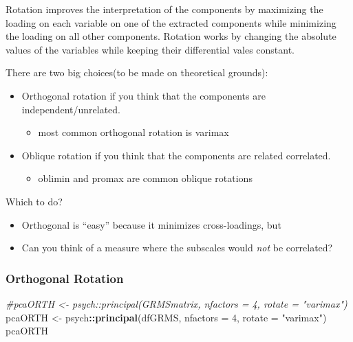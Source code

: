 \documentclass[
  english,
]{book}
\newenvironment{Shaded}{\begin{snugshade}}{\end{snugshade}}
\newcommand{\CommentTok}[1]{\textcolor[rgb]{0.56,0.35,0.01}{\textit{#1}}}
\newcommand{\DataTypeTok}[1]{\textcolor[rgb]{0.13,0.29,0.53}{#1}}
\newcommand{\DecValTok}[1]{\textcolor[rgb]{0.00,0.00,0.81}{#1}}
\newcommand{\KeywordTok}[1]{\textcolor[rgb]{0.13,0.29,0.53}{\textbf{#1}}}
\newcommand{\NormalTok}[1]{#1}
\newcommand{\OperatorTok}[1]{\textcolor[rgb]{0.81,0.36,0.00}{\textbf{#1}}}
\newcommand{\StringTok}[1]{\textcolor[rgb]{0.31,0.60,0.02}{#1}}
\providecommand{\tightlist}{%
  \setlength{\itemsep}{0pt}\setlength{\parskip}{0pt}}
\begin{document}
Rotation improves the interpretation of the components by maximizing the loading on each variable on one of the extracted components while minimizing the loading on all other components. Rotation works by changing the absolute values of the variables while keeping their differential vales constant.

There are two big choices(to be made on theoretical grounds):

\begin{itemize}
\tightlist
\item
  Orthogonal rotation if you think that the components are independent/unrelated.

  \begin{itemize}
  \tightlist
  \item
    most common orthogonal rotation is varimax
  \end{itemize}
\item
  Oblique rotation if you think that the components are related correlated.

  \begin{itemize}
  \tightlist
  \item
    oblimin and promax are common oblique rotations
  \end{itemize}
\end{itemize}

Which to do?

\begin{itemize}
\tightlist
\item
  Orthogonal is ``easy'' because it minimizes cross-loadings, but
\item
  Can you think of a measure where the subscales would \emph{not} be correlated?
\end{itemize}

\hypertarget{orthogonal-rotation}{%
\subsubsection{Orthogonal Rotation}\label{orthogonal-rotation}}

\begin{Shaded}
\begin{Highlighting}[]
\CommentTok{#pcaORTH <- psych::principal(GRMSmatrix, nfactors = 4, rotate = "varimax")}
\NormalTok{pcaORTH <-}\StringTok{ }\NormalTok{psych}\OperatorTok{::}\KeywordTok{principal}\NormalTok{(dfGRMS, }\DataTypeTok{nfactors =} \DecValTok{4}\NormalTok{, }\DataTypeTok{rotate =} \StringTok{"varimax"}\NormalTok{)}
\NormalTok{pcaORTH}
\end{Highlighting}
\end{Shaded}
\end{document}
